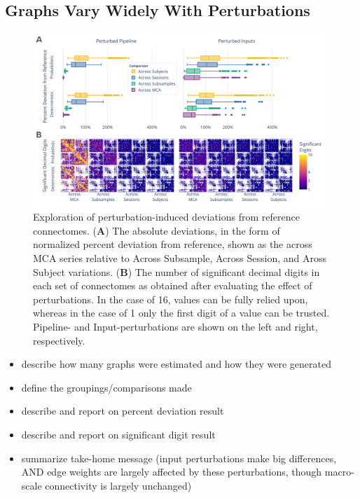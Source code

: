 \documentclass[fleqn,10pt]{SelfArx} %
\begin{document}
\subsection*{Graphs Vary Widely With Perturbations}
\begin{figure}[hbt]\centering
\includegraphics[width=\linewidth]{figures/fig1_absolute_differences.pdf}
\caption{Exploration of perturbation-induced deviations from reference connectomes.
(\textbf{A}) The absolute deviations, in the form of normalized percent deviation from reference, shown as the
across MCA series relative to Across Subsample, Across Session, and Aross Subject variations.
(\textbf{B}) The number of significant decimal digits in each set of connectomes as obtained after evaluating the
effect of perturbations. In the case of 16, values can be fully relied upon, whereas in the case of 1 only the first
digit of a value can be trusted. Pipeline- and Input-perturbations are shown on the left and right, respectively.}
\label{fig:absolute}
\end{figure}

\begin{itemize}
\item describe how many graphs were estimated and how they were generated
\item define the groupings/comparisons made
\item describe and report on percent deviation result
\item describe and report on significant digit result
\item summarize take-home message (input perturbations make big differences, AND edge weights are largely affected by
these perturbations, though macro-scale connectivity is largely unchanged)
\end{itemize}
\end{document}
